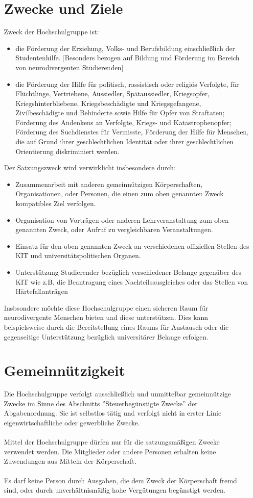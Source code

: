 \documentclass[11pt]{article}
\begin{document}
	\section{Zwecke und Ziele}
    \label{zweck}
	Zweck der Hochschulgruppe ist:
	\begin{itemize}
		\item die Förderung der Erziehung, Volks- und Berufsbildung einschließlich der Studentenhilfe. [Besonders bezogen auf Bildung und Förderung im Bereich von neurodivergenten Studierenden]
		\item die Förderung der Hilfe für politisch, rassistisch oder religiös Verfolgte, für Flüchtlinge, Vertriebene, Aussiedler, Spätaussiedler, Kriegsopfer, Kriegshinterbliebene, Kriegsbeschädigte und Kriegsgefangene, Zivilbeschädigte und Behinderte sowie Hilfe für Opfer von Straftaten; Förderung des Andenkens an Verfolgte, Kriegs- und Katastrophenopfer; Förderung des Suchdienstes für Vermisste, Förderung der Hilfe für Menschen, die auf Grund ihrer geschlechtlichen Identität oder ihrer geschlechtlichen Orientierung diskriminiert werden.
	\end{itemize}
	Der Satzungszweck wird verwirklicht insbesondere durch:
	\begin{itemize}
		\item Zusammenarbeit mit anderen gemeinnützigen Körperschaften, Organisationen, oder Personen, die einen zum oben genannten Zweck kompatibles Ziel verfolgen.
		\item Organisation von Vorträgen oder anderen Lehrveranstaltung zum oben genannten Zweck, oder Aufruf zu vergleichbaren Veranstaltungen.
		\item Einsatz für den oben genannten Zweck an verschiedenen offiziellen Stellen des KIT und universitätspolitischen Organen.
        \item Unterstützung Studierender bezüglich verschiedener Belange gegenüber des KIT wie z.B. die Beantragung eines Nachteilsausgleiches oder das Stellen von Härtefallanträgen
	\end{itemize}
    Insbsondere möchte diese Hochschulgruppe einen sicheren Raum für neurodivergente Menschen bieten und diese unterstützen. Dies kann beispielsweise durch die Bereitstellung eines Raums für Austausch oder die gegenseitige Unterstützung bezüglich universitärer Belange erfolgen.
 
	\section{Gemeinnützigkeit}
	Die Hochschulgruppe verfolgt ausschließlich und unmittelbar gemeinnützige Zwecke im Sinne
	des Abschnitts ''Steuerbegünstigte Zwecke'' der Abgabenordnung. Sie ist selbstlos tätig und verfolgt
	nicht in erster Linie eigenwirtschaftliche oder gewerbliche Zwecke.\\\\
	Mittel der Hochschulgruppe dürfen nur für die satzungsmäßigen Zwecke verwendet werden. Die
	Mitglieder oder andere Personen erhalten keine Zuwendungen aus Mitteln der Körperschaft.\\\\
	Es darf keine Person durch Ausgaben, die dem Zweck der Körperschaft fremd sind, oder durch
	unverhältnismäßig hohe Vergütungen begünstigt werden.
\end{document}
